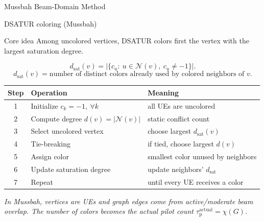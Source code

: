 \documentclass[10pt,aspectratio=169]{beamer}
\newcommand{\tauactual}{\tau_{\mathrm{p}}^{\mathrm{actual}}}
\newcommand{\callout}[1]{%
    \vspace{0.3em}
    {\footnotesize\itshape #1}
}
\begin{document}
\begin{frame}{Mussbah Beam-Domain Method}
\end{frame}

\begin{frame}{DSATUR coloring (Mussbah)}
    \small
    \begin{block}{Core idea}
        Among uncolored vertices, DSATUR colors first the vertex with the largest saturation degree.
    \end{block}
    
    \vspace{-0.2em}
    \[
        d_{\mathrm{sat}}(v)
        =
        \left|
        \{c_u:\ u\in\mathcal{N}(v),\ c_u\neq -1\}
        \right|.
    \]
    \vspace{-0.7em}
    \[
        d_{\mathrm{sat}}(v)
        =
        \text{number of distinct colors already used by colored neighbors of } v.
    \]
    
    \vspace{0.1em}
    \centering
    \scriptsize
    \begin{tabular}{cll}
        \toprule
        Step & Operation                                & Meaning                                \\
        \midrule
        1    & Initialize \(c_k=-1,\ \forall k\)        & all UEs are uncolored                  \\
        2    & Compute degree \(d(v)=|\mathcal{N}(v)|\) & static conflict count                  \\
        3    & Select uncolored vertex                  & choose largest \(d_{\mathrm{sat}}(v)\) \\
        4    & Tie-breaking                             & if tied, choose largest \(d(v)\)       \\
        5    & Assign color                             & smallest color unused by neighbors     \\
        6    & Update saturation degree                 & update neighbors' \(d_{\mathrm{sat}}\) \\
        7    & Repeat                                   & until every UE receives a color        \\
        \bottomrule
    \end{tabular}
    
    \vspace{0.45em}
    \callout{In Mussbah, vertices are UEs and graph edges come from active/moderate beam overlap. The number of colors becomes the actual pilot count \(\tauactual=\chi(G)\).}
\end{frame}
\end{document}
